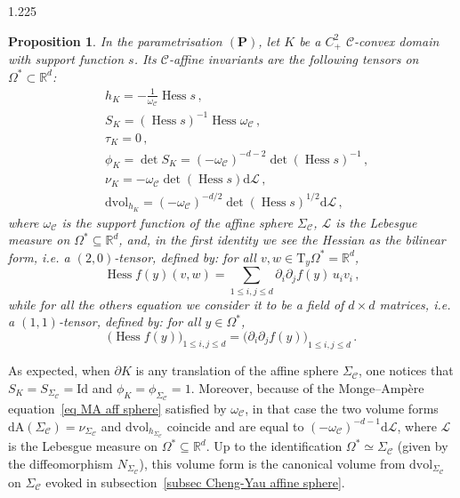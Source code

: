 \documentclass[reqno, a4paper]{amsart}
\numberwithin{equation}{section}
\numberwithin{figure}{section}
\newtheorem{proposition}[theorem]{Proposition}
\theoremstyle{definition}
\theoremstyle{remark}
\newcommand{\R}{\mathbb{R}} %
\newcommand{\Id}{\mathrm{Id}} %
\newcommand{\dif}{\mathrm{d}} %
\DeclareMathOperator{\Hess}{Hess} %
\newcommand{\C}{\mathcal{C}} %
\renewcommand{\S}{\Sigma_\C} %
\newcommand{\dvol}{\dif \mathrm{vol}} %
\newcommand{\Area}{\mathrm{A}} %
\newcommand{\bp}[1]{{\bigl( {#1} \bigr)}} %
\begin{document}
\begin{spacing}{1.225}
\begin{proposition}
\label{prop aff invariants relative aff sphere}
In the parametrisation $(\mathbf{P})$, let $K$ be a $C^2_+$ $\C$-convex domain with support function $s$. Its $\C$-affine invariants are the following tensors on $\Omega^* \subset \R^{d}$:
\begingroup
\allowdisplaybreaks
\begin{align*}
& h_K= -\frac{1}{\omega_\C} \Hess s \, ,\\
& S_K = (\Hess s)^{-1}\Hess\omega_\C \, ,\\
& \tau_K=0 \, ,\\
& \phi_K = \det S_K = (-\omega_\C)^{-d-2} \det(\Hess s)^{-1} \, ,\\
& \nu_K= -\omega_\C \det(\Hess s) \dif \mathcal{L} \, ,\\
& \dvol_{h_K} = (-\omega_\C) ^{-d/2} \det(\Hess s) ^{1/2} \dif \mathcal{L} \, ,
\end{align*}
\endgroup
where $\omega_\C$ is the support function of the affine sphere $\S$, $\mathcal{L}$ is the Lebesgue measure on $\Omega^* \subseteq \R^d$, and, in the first identity we see the Hessian as the bilinear form, i.e. a $(2,0)$-tensor, defined by: for all $v,w \in \mathrm{T}_y \Omega^*= \R^d$,
\begin{equation*}
\Hess f(y) (v,w) = \sum_{1\leq i,j \leq d} \partial_i \partial_j f(y) \, u_i v_i \, ,
\end{equation*}
while for all the others equation we consider it to be a field of $d \times d$ matrices, i.e. a $(1,1)$-tensor, defined by: for all $y \in \Omega^*$,
\begin{equation*}
\bp{\Hess f(y) }_{1\leq i,j \leq d} = \bp{\partial_i \partial_j f(y)}_{1\leq i,j \leq d} \, . 
\end{equation*}
\end{proposition}

As expected, when $\partial K$ is any translation of the affine sphere $\S$, one notices that $S_K = S_{\S} = \Id$ and $\phi_K=\phi_{\S} = 1$. Moreover, because of the Monge--Amp\`ere equation~\eqref{eq MA aff sphere} satisfied by $\omega_\C$, in that case the two volume forms $\dif \Area(\S) =\nu_{\S}$ and $\dvol_{h_{\S}}$ coincide and are equal to $(-\omega_\C) ^{-d-1} \dif \mathcal{L}$, where $\mathcal{L}$ is the Lebesgue measure on $\Omega^* \subseteq \R^d$. Up to the identification $\Omega^* \simeq \S$ (given by the diffeomorphism $N_{\S}$), this volume form is the canonical volume from $\dvol_{\S}$ on $\S$ evoked in subsection~\ref{subsec Cheng-Yau affine sphere}.


\end{spacing}
\end{document}
